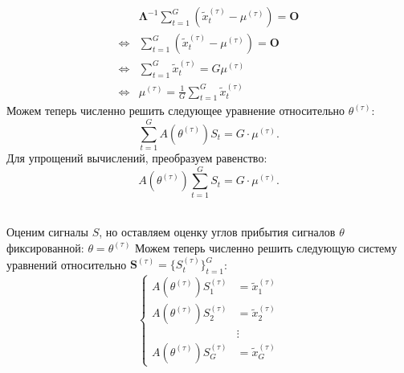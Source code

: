 \documentclass[11pt]{article}
\begin{document}
\begin{align*}
&\mathbf{\Lambda}^{-1} \sum_{t = 1}^{G} (\widetilde{x}_t^{(\tau)} - \mu^{(\tau)}) = \mathbf{O} \\
\iff& \sum_{t = 1}^{G} (\widetilde{x}_t^{(\tau)} - \mu^{(\tau)}) = \mathbf{O} \\
\iff& \sum_{t = 1}^{G} \widetilde{x}_t^{(\tau)} = G \mu^{(\tau)} \\
\iff& \mu^{(\tau)} = \frac{1}{G} \sum_{t = 1}^{G} \widetilde{x}_t^{(\tau)}
\end{align*}
Можем теперь численно решить следующее уравнение относительно $\theta^{(\tau)}$:
\begin{equation}
\sum_{t=1}^G A(\theta^{(\tau)})S_t = G \cdot \mu^{(\tau)}.
\end{equation}
Для упрощений вычислений, преобразуем равенство:
\begin{equation}
A(\theta^{(\tau)}) \sum_{t=1}^G S_t = G \cdot \mu^{(\tau)}.
\end{equation}
\\
\begin{center}
\fontsize{14}{18}\selectfont {}
\end{center}
Оценим сигналы $S$, но оставляем оценку углов прибытия сигналов $\theta$ фиксированной: $\theta = \theta^{(\tau)}$
Можем теперь численно решить следующую систему уравнений относительно $\mathbf{S}^{(\tau)}=\{S_t^{(\tau)}\}_{t=1}^G$:
\begin{equation}
\left\{
\begin{aligned}
A(\theta^{(\tau)}) S_1^{(\tau)} &= \widetilde{x}_1^{(\tau)} \\
A(\theta^{(\tau)}) S_2^{(\tau)} &= \widetilde{x}_2^{(\tau)} \\
&\vdots \\
A(\theta^{(\tau)}) S_G^{(\tau)} &= \widetilde{x}_G^{(\tau)}
\end{aligned}
\right.
\end{equation}
\begin{center}
\fontsize{16}{20}\selectfont {}
\end{center}
\begin{center}
\fontsize{14}{18}\selectfont {}
\end{center}
\begin{center}
\fontsize{14}{18}\selectfont {}
\end{center}
\begin{center}
\fontsize{14}{18}\selectfont {}
\end{center}
\begin{center}
\fontsize{14}{18}\selectfont {}
\end{center}
\begin{center}
\fontsize{16}{20}\selectfont {}
\end{center}
\end{document}

